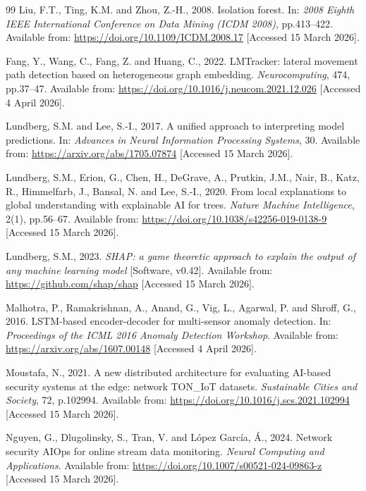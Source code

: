 \documentclass[12pt,a4paper]{report}
\begin{document}
\begin{thebibliography}{99}
Liu, F.T., Ting, K.M. and Zhou, Z.-H., 2008. Isolation forest. In: \textit{2008 Eighth IEEE International Conference on Data Mining (ICDM 2008)}, pp.413--422. Available from: \url{https://doi.org/10.1109/ICDM.2008.17} [Accessed 15 March 2026].

Fang, Y., Wang, C., Fang, Z. and Huang, C., 2022. LMTracker: lateral movement path detection based on heterogeneous graph embedding. \textit{Neurocomputing}, 474, pp.37--47. Available from: \url{https://doi.org/10.1016/j.neucom.2021.12.026} [Accessed 4 April 2026].

Lundberg, S.M. and Lee, S.-I., 2017. A unified approach to interpreting model predictions. In: \textit{Advances in Neural Information Processing Systems}, 30. Available from: \url{https://arxiv.org/abs/1705.07874} [Accessed 15 March 2026].

Lundberg, S.M., Erion, G., Chen, H., DeGrave, A., Prutkin, J.M., Nair, B., Katz, R., Himmelfarb, J., Bansal, N. and Lee, S.-I., 2020. From local explanations to global understanding with explainable AI for trees. \textit{Nature Machine Intelligence}, 2(1), pp.56--67. Available from: \url{https://doi.org/10.1038/s42256-019-0138-9} [Accessed 15 March 2026].

Lundberg, S.M., 2023. \textit{SHAP: a game theoretic approach to explain the output of any machine learning model} [Software, v0.42]. Available from: \url{https://github.com/shap/shap} [Accessed 15 March 2026].

Malhotra, P., Ramakrishnan, A., Anand, G., Vig, L., Agarwal, P. and Shroff, G., 2016. LSTM-based encoder-decoder for multi-sensor anomaly detection. In: \textit{Proceedings of the ICML 2016 Anomaly Detection Workshop}. Available from: \url{https://arxiv.org/abs/1607.00148} [Accessed 4 April 2026].

Moustafa, N., 2021. A new distributed architecture for evaluating AI-based security systems at the edge: network TON\_IoT datasets. \textit{Sustainable Cities and Society}, 72, p.102994. Available from: \url{https://doi.org/10.1016/j.scs.2021.102994} [Accessed 15 March 2026].

Nguyen, G., Dlugolinsky, S., Tran, V. and L\'{o}pez Garc\'{i}a, \'{A}., 2024. Network security AIOps for online stream data monitoring. \textit{Neural Computing and Applications}. Available from: \url{https://doi.org/10.1007/s00521-024-09863-z} [Accessed 15 March 2026].


\end{thebibliography}
\end{document}
